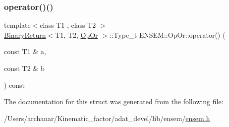 \mbox{\label{structENSEM_1_1OpOr_a8b897dcdf1e2210e064a33b281a22fc4}} 
\subsubsection{\texorpdfstring{operator()()}{operator()()}\hspace{0.1cm}{\footnotesize\ttfamily [2/2]}}
{\footnotesize\ttfamily template$<$class T1 , class T2 $>$ \\
\mbox{\hyperlink{structENSEM_1_1BinaryReturn}{Binary\+Return}}$<$T1, T2, \mbox{\hyperlink{structENSEM_1_1OpOr}{Op\+Or}} $>$\+::Type\+\_\+t E\+N\+S\+E\+M\+::\+Op\+Or\+::operator() (\begin{DoxyParamCaption}\item[{const T1 \&}]{a,  }\item[{const T2 \&}]{b }\end{DoxyParamCaption}) const\hspace{0.3cm}{\ttfamily [inline]}}



The documentation for this struct was generated from the following file\+:\begin{DoxyCompactItemize}
\item 
/\+Users/archanar/\+Kinematic\+\_\+factor/adat\+\_\+devel/lib/ensem/\mbox{\hyperlink{lib_2ensem_2ensem_8h}{ensem.\+h}}\end{DoxyCompactItemize}
